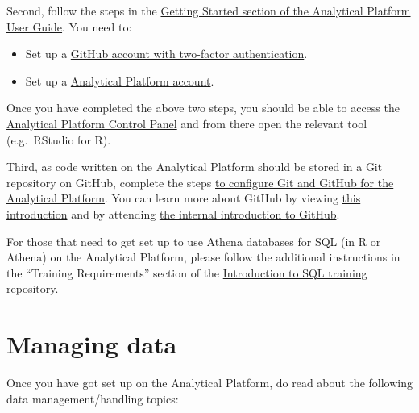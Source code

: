\documentclass[
]{book}
\providecommand{\tightlist}{%
  \setlength{\itemsep}{0pt}\setlength{\parskip}{0pt}}
\begin{document}
Second, follow the steps in the \href{https://user-guidance.services.alpha.mojanalytics.xyz/get-started.html\#get-started}{Getting Started section of the Analytical Platform User Guide}. You need to:

\begin{itemize}
\tightlist
\item
  Set up a \href{https://user-guidance.services.alpha.mojanalytics.xyz/get-started.html\#1-github-account}{GitHub account with two-factor authentication}.\\
\item
  Set up a \href{https://user-guidance.services.alpha.mojanalytics.xyz/get-started.html\#2-analytical-platform-account}{Analytical Platform account}.
\end{itemize}

Once you have completed the above two steps, you should be able to access the \href{https://controlpanel.services.alpha.mojanalytics.xyz/tools/}{Analytical Platform Control Panel} and from there open the relevant tool (e.g.~RStudio for R).

Third, as code written on the Analytical Platform should be stored in a Git repository on GitHub, complete the steps \href{https://user-guidance.services.alpha.mojanalytics.xyz/github.html\#setup-github-keys-to-access-it-from-r-studio-and-jupyter}{to configure Git and GitHub for the Analytical Platform}. You can learn more about GitHub by viewing \href{https://digital.gov/resources/an-introduction-github/}{this introduction} and by attending \href{https://moj-analytical-services.github.io/ap-tools-training/index.html\#internal-r-and-sql-training-group-materials}{the internal introduction to GitHub}.

For those that need to get set up to use Athena databases for SQL (in R or Athena) on the Analytical Platform, please follow the additional instructions in the ``Training Requirements'' section of the \href{https://github.com/moj-analytical-services/sql_training}{Introduction to SQL training repository}.

\hypertarget{managing-data}{%
\section{Managing data}\label{managing-data}}

Once you have got set up on the Analytical Platform, do read about the following data management/handling topics:
\end{document}
